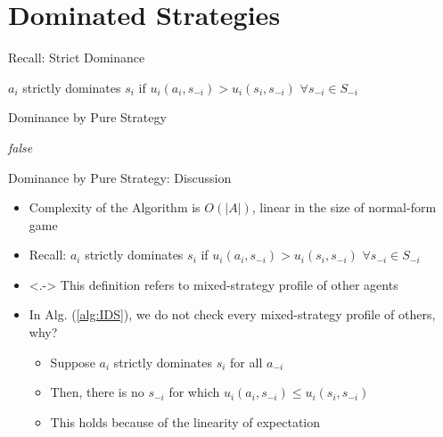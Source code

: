 \documentclass[11pt,aspectratio=169,handout]{beamer}
\begin{document}
 \section{Dominated Strategies}
  
  \begin{frame}{Recall: Strict Dominance}
   \begin{center}
    $a_i$ \alert{strictly dominates} $s_i$ if $u_i(a_i, s_{-i}) > u_i(s_i,s_{-i})$ $\forall s_{-i} \in S_{-i}$
   \end{center}
  \end{frame}
  
  
  \begin{frame}{Dominance by Pure Strategy}
   \begin{algorithm*}[H]
    \Return \textit{false}\;
   \label{alg:IDS}
   \caption{Determine whether $s_i$ is strictly dominated by any pure strategy}
   \end{algorithm*}
  \end{frame}
  
    
  \begin{frame}{Dominance by Pure Strategy: Discussion}
   \begin{itemize}[<+->]
   \setlength{\itemsep}{1.2em}
    \item Complexity of the Algorithm is $O(\vert A\vert)$, linear in the size of normal-form game
    \item Recall: $a_i$ \alert{strictly dominates} $s_i$ if $u_i(a_i, s_{-i}) > u_i(s_i,s_{-i})$ $\forall s_{-i} \in S_{-i}$
    \item<.-> This definition refers to mixed-strategy profile of other agents
    \item In Alg. (\ref{alg:IDS}), we do not check every mixed-strategy profile of others, why?
    \begin{itemize}
    \setlength{\itemsep}{0.8em}
     \item Suppose $a_i$ strictly dominates $s_i$ for all $a_{-i}$
     \item Then, there is no $s_{-i}$ for which $u_i(a_i, s_{-i}) \le u_i(s_i, s_{-i})$
     \item This holds because of the linearity of expectation
    \end{itemize}
   \end{itemize}
  \end{frame}
  
\end{document}
